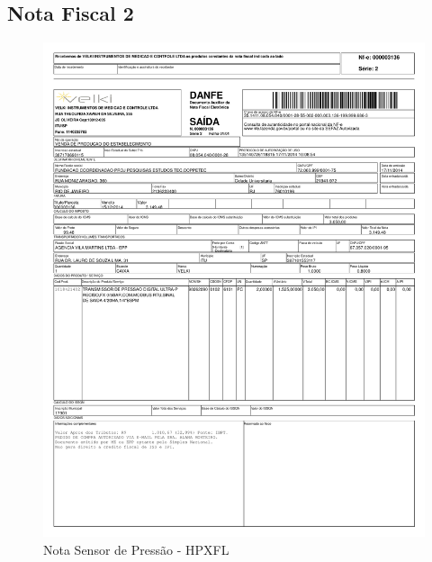  \subsection{Nota Fiscal 2}
\begin{figure}[H]
 \centering
 \includegraphics[width=1\columnwidth]{Pressao/nota_pressao2.pdf}
 \caption{Nota Sensor de Pressão - HPXFL}
 \end{figure}
